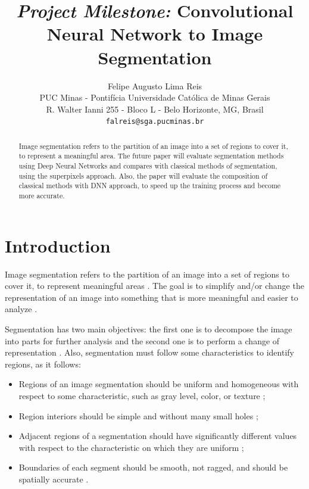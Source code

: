 \documentclass[10pt,twocolumn,letterpaper]{article}
\begin{document}
\title{\textit{Project Milestone:} Convolutional Neural Network to Image Segmentation}

\author{Felipe Augusto Lima Reis\\
PUC Minas - Pontif\'icia Universidade Cat\'olica de Minas Gerais\\
R. Walter Ianni 255 - Bloco L - Belo Horizonte, MG, Brasil\\
{\tt\small falreis@sga.pucminas.br}
}

\maketitle

\begin{abstract}
    Image segmentation refers to the partition of an image into a set of regions to cover it, to represent a meaningful area. The future paper will evaluate segmentation methods using Deep Neural Networks and compares with classical methods of segmentation, using the superpixels approach. Also, the paper will evaluate the composition of classical methods with DNN approach, to speed up the training process and become more accurate.
\end{abstract}

\section{Introduction} \label{introduction}

Image segmentation refers to the partition of an image into a set of regions to cover it, to represent meaningful areas \cite{DOMINGUEZ}. The goal is to simplify and/or change the representation of an image into something
that is more meaningful and easier to analyze \cite{AHMED_SARMA}.

Segmentation has two main objectives: the first one is to decompose the image into parts for further analysis and the second one is to perform a change of representation \cite{DOMINGUEZ}. Also, segmentation must follow some characteristics to identify regions, as it follows:

\begin{itemize}
 \item Regions of an image segmentation should be uniform and homogeneous with respect to some characteristic, such as gray level, color, or texture \cite{DOMINGUEZ};
 \item Region interiors should be simple and without many small holes \cite{DOMINGUEZ};
 \item Adjacent regions of a segmentation should have significantly different values with respect to the characteristic on which they are uniform \cite{DOMINGUEZ};
 \item Boundaries of each segment should be smooth, not ragged, and should be spatially accurate \cite{DOMINGUEZ}.
\end{itemize}
\end{document}
